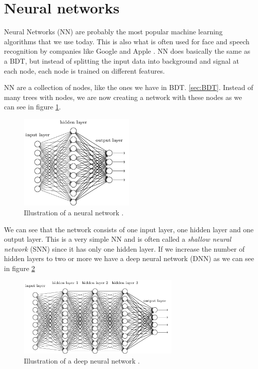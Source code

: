 \section{Neural networks}
\label{sec:NN}
Neural Networks (NN) are probably the most popular machine learning algorithms that we use today. This is also what is often used for face and speech recognition by companies like Google and Apple \cite{NNarticle}. NN does basically the same as a BDT, but instead of splitting the input data into background and signal at each node, each node is trained on different features. 

NN are a collection of nodes, like the ones we have in BDT. \ref{sec:BDT}. Instead of many trees with nodes, we are now creating a network with these nodes as we can see in figure \ref{fig:NN}. 


\begin{figure}[H]
    \centering
    \includegraphics[width = 0.5\textwidth]{Figures/FromOnline/tikz35.png}
    \caption{Illustration of a neural network \cite{NNpic}.}
    \label{fig:NN}
\end{figure}

We can see that the network consists of one input layer, one hidden layer and one output layer. This is a very simple NN and is often called a \textit{shallow neural network} (SNN) since it has only one hidden layer. If we increase the number of hidden layers to two or more we have a deep neural network (DNN) as we can see in figure \ref{fig:DNN}

\begin{figure}[H]
    \centering
    \includegraphics[width = 0.7\textwidth]{Figures/FromOnline/tikz36.png}
    \caption{Illustration of a deep neural network \cite{NNpic}.}
    \label{fig:DNN}
\end{figure}

